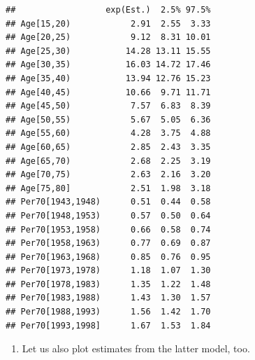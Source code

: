 \documentclass[
]{book}
\newenvironment{Shaded}{\begin{snugshade}}{\end{snugshade}}
\newcommand{\AttributeTok}[1]{\textcolor[rgb]{0.13,0.29,0.53}{#1}}
\newcommand{\DecValTok}[1]{\textcolor[rgb]{0.00,0.00,0.81}{#1}}
\newcommand{\FunctionTok}[1]{\textcolor[rgb]{0.13,0.29,0.53}{\textbf{#1}}}
\newcommand{\NormalTok}[1]{#1}
\newcommand{\OtherTok}[1]{\textcolor[rgb]{0.56,0.35,0.01}{#1}}
\newcommand{\SpecialCharTok}[1]{\textcolor[rgb]{0.81,0.36,0.00}{\textbf{#1}}}
\providecommand{\tightlist}{%
  \setlength{\itemsep}{0pt}\setlength{\parskip}{0pt}}
\begin{document}
\begin{Shaded}
\end{Shaded}

\begin{verbatim}
##                  exp(Est.)  2.5% 97.5%
## Age[15,20)            2.91  2.55  3.33
## Age[20,25)            9.12  8.31 10.01
## Age[25,30)           14.28 13.11 15.55
## Age[30,35)           16.03 14.72 17.46
## Age[35,40)           13.94 12.76 15.23
## Age[40,45)           10.66  9.71 11.71
## Age[45,50)            7.57  6.83  8.39
## Age[50,55)            5.67  5.05  6.36
## Age[55,60)            4.28  3.75  4.88
## Age[60,65)            2.85  2.43  3.35
## Age[65,70)            2.68  2.25  3.19
## Age[70,75)            2.63  2.16  3.20
## Age[75,80]            2.51  1.98  3.18
## Per70[1943,1948)      0.51  0.44  0.58
## Per70[1948,1953)      0.57  0.50  0.64
## Per70[1953,1958)      0.66  0.58  0.74
## Per70[1958,1963)      0.77  0.69  0.87
## Per70[1963,1968)      0.85  0.76  0.95
## Per70[1973,1978)      1.18  1.07  1.30
## Per70[1978,1983)      1.35  1.22  1.48
## Per70[1983,1988)      1.43  1.30  1.57
## Per70[1988,1993)      1.56  1.42  1.70
## Per70[1993,1998]      1.67  1.53  1.84
\end{verbatim}

\begin{enumerate}
\def\labelenumi{\arabic{enumi}.}
\setcounter{enumi}{3}
\tightlist
\item
  Let us also plot estimates from the latter model, too.
\end{enumerate}
\end{document}
